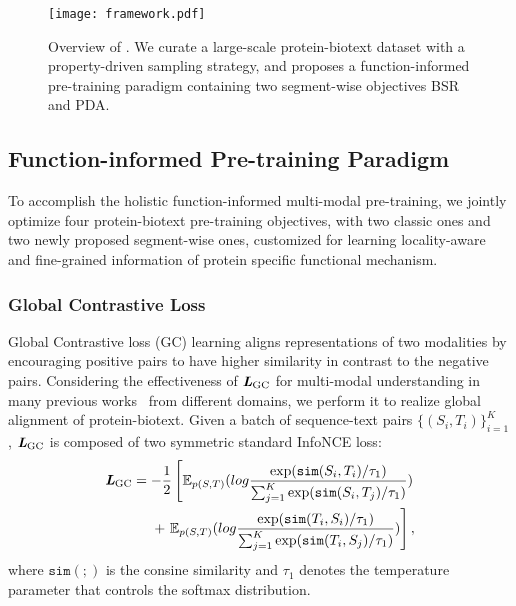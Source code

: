 \begin{figure*}[htbp]
    \centering
    \texttt{[image: framework.pdf]}
    \caption{Overview of \ourapproach. We curate a large-scale protein-biotext dataset \ourdataset with a property-driven sampling strategy, and proposes a function-informed pre-training paradigm containing two segment-wise objectives BSR and PDA. }
    \vspace{-1em}
    \label{Fig:framework}
\end{figure*}

\subsection{Function-informed Pre-training Paradigm}
To accomplish the holistic function-informed multi-modal pre-training, we jointly optimize four protein-biotext pre-training objectives, with two classic ones and two newly proposed segment-wise ones, customized for learning locality-aware and fine-grained information of protein specific functional mechanism. 

\subsubsection{Global Contrastive Loss}
Global Contrastive loss (GC) learning aligns representations of two modalities by encouraging positive pairs to have higher similarity in contrast to the negative pairs. Considering the effectiveness of $\textit{\textbf{L}}_{\text{GC}}$ for multi-modal understanding in many previous works~\cite{clip,BLIP2,MoSu} from different domains, we perform it to realize global alignment of protein-biotext. Given a batch of sequence-text pairs $\{(S_i, T_i)\}_{i=1}^{K}$, $\textit{\textbf{L}}_{\text{GC}}$ is composed of two symmetric standard InfoNCE loss:
\begin{equation}
\begin{split}
    \textit{\textbf{L}}_{\text{GC}} = -\frac{1}{2} \left[ \mathbb{E}_{p(S,T)}(log\frac{\exp(\mathtt{sim}(S_i, T_i)/\tau_1)}{\sum_{j=1}^{K} \exp(\mathtt{sim}(S_i, T_j)/\tau_1)}) \right. \\
    \left. +~\mathbb{E}_{p(S,T)}(log\frac{\exp(\mathtt{sim}(T_i, S_i)/\tau_1)}{\sum_{j=1}^{K} \exp(\mathtt{sim}(T_i, S_j)/\tau_1)}) \right ],
\end{split}
\end{equation}
where $\mathtt{sim}(;)$ is the consine similarity and $\tau_1$ denotes the temperature parameter that controls the softmax distribution.

